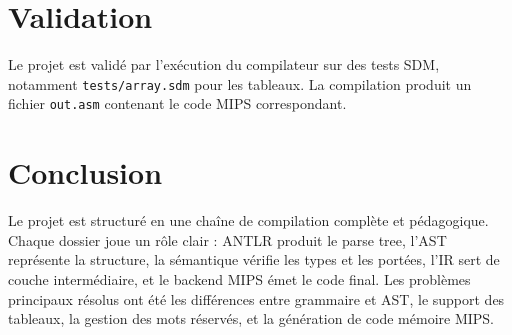 \documentclass[a4paper,11pt]{article}
\begin{document}
\section{Validation}
Le projet est validé par l'exécution du compilateur sur des tests SDM, notamment \texttt{tests/array.sdm} pour les tableaux. La compilation produit un fichier \texttt{out.asm} contenant le code MIPS correspondant.

\section*{Conclusion}
Le projet est structuré en une chaîne de compilation complète et pédagogique. Chaque dossier joue un rôle clair : ANTLR produit le parse tree, l'AST représente la structure, la sémantique vérifie les types et les portées, l'IR sert de couche intermédiaire, et le backend MIPS émet le code final. Les problèmes principaux résolus ont été les différences entre grammaire et AST, le support des tableaux, la gestion des mots réservés, et la génération de code mémoire MIPS.
\end{document}
